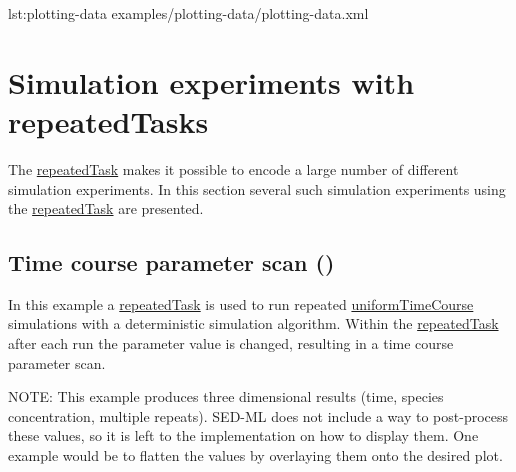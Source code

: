 {lst:plotting-data}
{examples/plotting-data/plotting-data.xml}

\section{Simulation experiments with repeatedTasks}
The \hyperref[class:repeatedTask]{repeatedTask} makes it possible to encode a large number of different simulation experiments. In this section several such simulation experiments using the \hyperref[class:repeatedTask]{repeatedTask} are presented.

\subsection{Time course parameter scan ()}
In this example a \hyperref[class:repeatedTask]{repeatedTask} is used to run repeated \hyperref[class:uniformTimeCourse]{uniformTimeCourse} simulations with a deterministic simulation algorithm. Within the \hyperref[class:repeatedTask]{repeatedTask} after each run the parameter value is changed, resulting in a time course parameter scan.

NOTE: This example produces three dimensional results (time, species concentration, multiple repeats).  SED-ML \currentLV does not include a way to post-process these values, so it is left to the implementation on how to display them. One example would be to flatten the values by overlaying them onto the desired plot.

